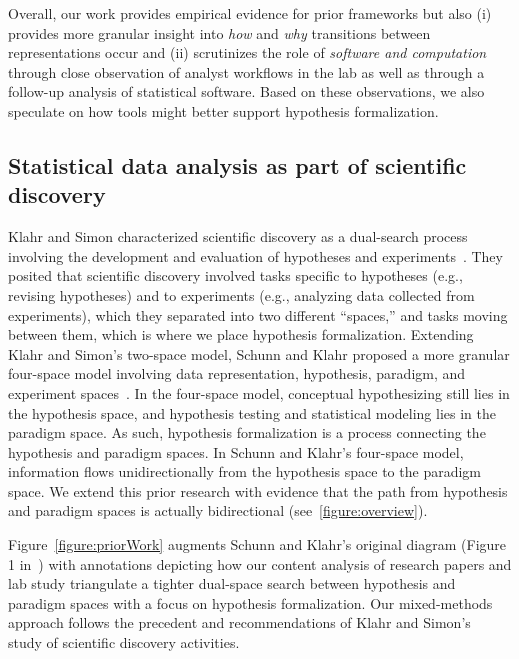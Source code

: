 Overall, our work provides empirical evidence for prior frameworks but also (i)
provides more granular insight into \textit{how} and \textit{why} transitions between
representations occur and (ii) scrutinizes the role of
\textit{software and computation} through close observation of analyst workflows
in the lab as well as through a follow-up analysis of statistical software. Based on
these observations, we also speculate on how tools might better support hypothesis
formalization.

\subsection{Statistical data analysis as part of scientific discovery}
Klahr and Simon characterized scientific discovery as a dual-search process
involving the development and evaluation of hypotheses and
experiments~\cite{klahr1988dual}. They posited that scientific discovery
involved tasks specific to hypotheses (e.g., revising hypotheses) and to
experiments (e.g., analyzing data collected from experiments), which they
separated into two different ``spaces,'' and tasks moving between them, which is
where we place hypothesis formalization. Extending Klahr and Simon's two-space
model, Schunn and Klahr proposed a more granular four-space model involving data
representation, hypothesis, paradigm, and experiment
spaces~\cite{schunn1995FourSpace,schunn1996BeyondTwoSpace}. In the four-space
model, conceptual hypothesizing still lies in the hypothesis space, and
hypothesis testing and statistical modeling lies in the paradigm space. As such,
hypothesis formalization is a process connecting the hypothesis and paradigm
spaces. In Schunn and Klahr's four-space model, information flows
unidirectionally from the hypothesis space to the paradigm space. We extend this
prior research with evidence that the path from hypothesis and paradigm spaces
is actually bidirectional (see~\autoref{figure:overview}).

Figure~\ref{figure:priorWork} augments Schunn and Klahr's
original diagram (Figure 1 in~\cite{schunn1995FourSpace}) with
annotations depicting how our content analysis of research papers and lab study
triangulate a tighter dual-space search between hypothesis and
paradigm spaces with a focus on hypothesis formalization. Our mixed-methods
approach follows the precedent and recommendations of Klahr and
Simon's~\cite{klahr1999studies} study of scientific discovery activities.


